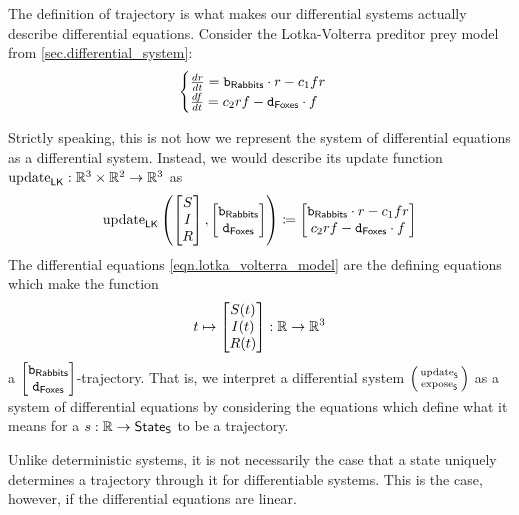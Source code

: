 \documentclass[DynamicalBook]{subfiles}
\begin{document}
The definition of trajectory is what makes our differential systems actually
describe differential equations. Consider the Lotka-Volterra preditor prey model
from \cref{sec.differential_system}:
\begin{equation}\label{eqn.lotka_volterra_model}
  \begin{cases}
    
\frac{dr}{dt} =  \mathtt{b}_{\mathsf{Rabbits}}
\cdot r - c_1 f r \\
\frac{df}{dt} = c_2 r f - \mathtt{d}_{\mathsf{Foxes}}
\cdot f
  \end{cases}
\end{equation}

  Strictly speaking, this is not how we represent the system of differential
  equations as a differential system. Instead, we would describe its update
  function $\mathrm{update}_{\mathsf{LK}} : \mathbb{R}^3 \times \mathbb{R}^2 \to \mathbb{R}^3$ as
  \[
\mathrm{update}_{\mathsf{LK}}\left( \begin{bmatrix}S \\ I \\ R \end{bmatrix}, \begin{bmatrix}
    \mathtt{b}_{\mathsf{Rabbits}} \\ \mathtt{d}_{\mathsf{Foxes}} \end{bmatrix}\right)
  \coloneqq \begin{bmatrix}\mathtt{b}_{\mathsf{Rabbits}}
\cdot r - c_1 f r \\ c_2 r f - \mathtt{d}_{\mathsf{Foxes}}
\cdot f
 \end{bmatrix}
  \]
The differential equations \cref{eqn.lotka_volterra_model} are the defining equations
which make the function
$$t \mapsto \begin{bmatrix}S(t) \\ I(t) \\ R(t) \end{bmatrix} : \mathbb{R} \to \mathbb{R}^3$$
a $\begin{bmatrix}\mathtt{b}_{\mathsf{Rabbits}} \\
  \mathtt{d}_{\mathsf{Foxes}} \end{bmatrix}$-trajectory. That is, we interpret a
differential system $\lens{\update{S}}{\expose{S}}$ as a system of differential
equations by considering the equations which define what it means for a $s : \mathbb{R}
\to \mathsf{State}_{\mathsf{S}}$ to be a trajectory.
  
Unlike deterministic systems, it is not necessarily the case that a state
uniquely determines a trajectory through it for differentiable systems. This is
the case, however, if the differential equations are linear.
\end{document}
